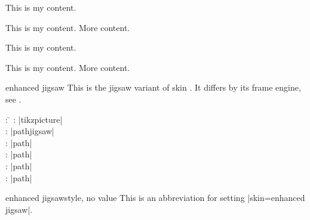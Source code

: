 \begin{dispExample}
\begin{tcbraster}[skin=enhancedlast,raster equal height,raster columns=4,
    colback=LightGreen,colframe=DarkGreen,colbacktitle=LimeGreen!75!DarkGreen,
    left=1mm,right=1mm,top=1mm,bottom=1mm,middle=1mm]
  \begin{tcolorbox}
    This is my content.
  \end{tcolorbox}
  \begin{tcolorbox}
    This is my content.
    \tcblower
    More content.
  \end{tcolorbox}
  \begin{tcolorbox}[adjusted title=My title]
    This is my content.
  \end{tcolorbox}
  \begin{tcolorbox}[adjusted title=My title]
    This is my content.
    \tcblower
    More content.
  \end{tcolorbox}
\end{tcbraster}
\end{dispExample}


\clearpage
\begin{docSkin}{enhanced jigsaw}
  This is the jigsaw variant of skin .
  It differs by its frame engine, see .
\begin{tcolorbox}[skintable=enhanced jigsaw]
  \begin{tabbing}
    : \=\kill
    :  \> |tikzpicture|\\ 
    :           \> |pathjigsaw|\\
    : \> |path|\\ 
    :        \> |path|\\
    :    \> |path|\\
    :           \> |path|
  \end{tabbing}
\end{tcolorbox}
\end{docSkin}

\begin{docTcbKey}{enhanced jigsaw}{}{style, no value}
  This is an abbreviation for setting |skin=enhanced jigsaw|.
\end{docTcbKey}

